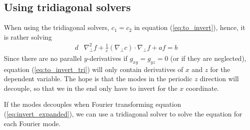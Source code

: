 \subsection{Using tridiagonal solvers}
%
When using the tridiagonal solvers, $c_1 = c_2$ in equation (\ref{eq:to_invert}), hence, it is rather solving
%
\begin{align}
    d&\nabla_\perp^2f + \frac{1}{c}(\nabla_\perp c)\cdot\nabla_\perp f + af = b
%
\label{eq:to_invert_tri}
%
\end{align}
%
Since there are no parallel $y$-derivatives if $g_{xy}=g_{yz}=0$ (or if they are neglected), equation (\ref{eq:to_invert_tri}) will only contain derivatives of $x$ and $z$ for the dependent variable.
The hope is that the modes in the periodic $z$ direction will decouple, so that we in the end only have to invert for the $x$ coordinate.

If the modes decouples when Fourier transforming equation (\ref{eq:invert_expanded}), we can use a tridiagonal solver to solve the equation for each Fourier mode.

